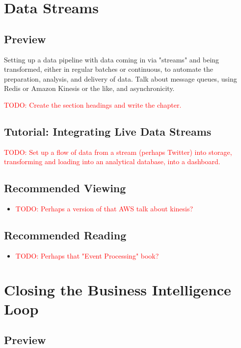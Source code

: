 \documentclass[11pt]{book}
\newcommand{\todo}[1]{\textcolor{red}{TODO: #1}} %
\begin{document}
\chapter{Data Streams}

\section*{Preview}

Setting up a data pipeline with data coming in via "streams" and being transformed, either in regular batches or continuous, to automate the preparation, analysis, and delivery of data.  Talk about message queues, using Redis or Amazon Kinesis or the like, and asynchronicity.

\todo{Create the section headings and write the chapter.}

\section{Tutorial: Integrating Live Data Streams}

\todo{Set up a flow of data from a stream (perhaps Twitter) into storage, transforming and loading into an analytical database, into a dashboard.}

\section*{Recommended Viewing}
\begin{itemize}
    \item \todo{Perhaps a version of that AWS talk about kinesis?}
\end{itemize}

\section*{Recommended Reading}
\begin{itemize}
    \item \todo{Perhaps that "Event Processing" book?}
\end{itemize}








\chapter{Closing the Business Intelligence Loop}

\section*{Preview}
\end{document}

